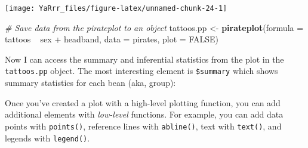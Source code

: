\documentclass[]{book}
\newenvironment{Shaded}{\begin{snugshade}}{\end{snugshade}}
\newcommand{\KeywordTok}[1]{\textcolor[rgb]{0.13,0.29,0.53}{\textbf{{#1}}}}
\newcommand{\DataTypeTok}[1]{\textcolor[rgb]{0.13,0.29,0.53}{{#1}}}
\newcommand{\StringTok}[1]{\textcolor[rgb]{0.31,0.60,0.02}{{#1}}}
\newcommand{\CommentTok}[1]{\textcolor[rgb]{0.56,0.35,0.01}{\textit{{#1}}}}
\newcommand{\OtherTok}[1]{\textcolor[rgb]{0.56,0.35,0.01}{{#1}}}
\newcommand{\NormalTok}[1]{{#1}}
\theoremstyle{definition}
\theoremstyle{definition}
\theoremstyle{remark}
\begin{document}
\begin{center}\texttt{[image: YaRrr\_files/figure-latex/unnamed-chunk-24-1]} \end{center}

\begin{Shaded}
\begin{Highlighting}[]

\CommentTok{# Save data from the pirateplot to an object}
\NormalTok{tattoos.pp <-}\StringTok{ }\KeywordTok{pirateplot}\NormalTok{(}\DataTypeTok{formula =} \NormalTok{tattoos ~}\StringTok{ }\NormalTok{sex +}\StringTok{ }\NormalTok{headband,}
                         \DataTypeTok{data =} \NormalTok{pirates,}
                         \DataTypeTok{plot =} \OtherTok{FALSE}\NormalTok{)}
\end{Highlighting}
\end{Shaded}

Now I can access the summary and inferential statistics from the plot in
the \texttt{tattoos.pp} object. The most interesting element is
\texttt{\$summary} which shows summary statistics for each bean (aka,
group):

\begin{Shaded}
\end{Shaded}

Once you've created a plot with a high-level plotting function, you can
add additional elements with \emph{low-level} functions. For example,
you can add data points with \texttt{points()}, reference lines with
\texttt{abline()}, text with \texttt{text()}, and legends with
\texttt{legend()}.
\end{document}
